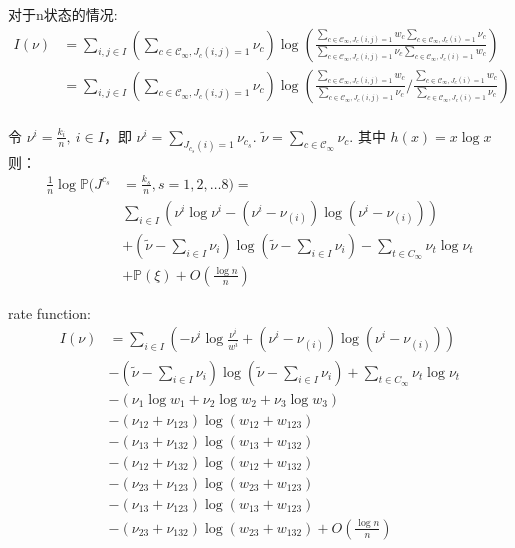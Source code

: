 \documentclass[cn,hazy,egreen,14pt,normal]{elegantnote}
\begin{document}
对于n状态的情况:
\begin{align*}
    I(\nu) &=  \sum_{i, j \in I} \left(\sum_{c \in \mathcal{C_{\infty}}, J_c(i, j)=1}
    \nu_c \right) \log(\frac{\sum_{c \in \mathcal{C_{\infty}}, J_c(i, j)=1} w_c \sum_{c \in \mathcal{C_{\infty}}, J_c(i)=1} \nu_c}{\sum_{c \in \mathcal{C_{\infty}}, J_c(i, j)=1} \nu_c \sum_{c \in \mathcal{C_{\infty}}, J_c(i)=1} w_c}) \\
    &= \sum_{i, j \in I} \left(\sum_{c \in \mathcal{C_{\infty}}, J_c(i, j)=1}
    \nu_c \right) \log(\frac{\sum_{c \in \mathcal{C_{\infty}}, J_c(i, j)=1} w_c }{\sum_{c \in \mathcal{C_{\infty}}, J_c(i, j)=1} \nu_c }
    /\frac{\sum_{c \in \mathcal{C_{\infty}}, J_c(i)=1} w_c}{\sum_{c \in \mathcal{C_{\infty}}, J_c(i)=1} \nu_c}) \\
\end{align*}

令 $\nu^{i} = \frac{k_i}{n}, ~i\in I$，即 $\nu^{i} = \sum_{J_{c_s}(i)=1} \nu_{c_s}$.
$\tilde{\nu} = \sum_{c \in \mathcal{C}_{\infty}} \nu_{c}$.
其中 $h(x) = x \log x$
则：  
\begin{align*}
    \frac{1}{n} \log \mathbb{P} (J^{c_s} &= \frac{k_s}{n}, s = 1, 2, \dots 8) = \\
    &\sum_{i \in I} \left(\nu^{i} \log \nu^{i} - (\nu^{i} - \nu_{(i)}) \log(\nu^{i} - \nu_{(i)})\right) \\
    &+(\tilde{\nu} - \sum_{i \in I} \nu_{i}) \log (\tilde{\nu} - \sum_{i \in I} \nu_{i})
    -\sum_{t \in C_{\infty}} \nu_t \log \nu_t \\
    &+ \mathbb{P}(\xi)  + O(\frac{\log n}{n}) 
\end{align*}

rate function:
\begin{align*}
    I(\nu) 
    &= \sum_{i \in I} \left(-\nu^{i} \log \frac{\nu^{i}}{w^{i}} + (\nu^{i} - \nu_{(i)}) \log(\nu^{i} - \nu_{(i)})\right) \\
    &-(\tilde{\nu} - \sum_{i \in I} \nu_i) \log (\tilde{\nu} - \sum_{i \in I} \nu_i)
    +\sum_{t \in C_{\infty}} \nu_t \log \nu_t \\
    &- (\nu_{1} \log w_{1} + \nu_{2} \log w_{2} + \nu_{3} \log w_{3})\\
    &- (\nu_{12} + \nu_{123}) \log(w_{12} + w_{123}) \\
    &- (\nu_{13} + \nu_{132}) \log(w_{13} + w_{132}) \\
    &- (\nu_{12} + \nu_{132}) \log(w_{12} + w_{132}) \\
    &- (\nu_{23} + \nu_{123}) \log(w_{23} + w_{123}) \\
    &- (\nu_{13} + \nu_{123}) \log(w_{13} + w_{123}) \\
    &- (\nu_{23} + \nu_{132}) \log(w_{23} + w_{132}) 
    + O(\frac{\log n}{n}) 
\end{align*}
\end{document}
